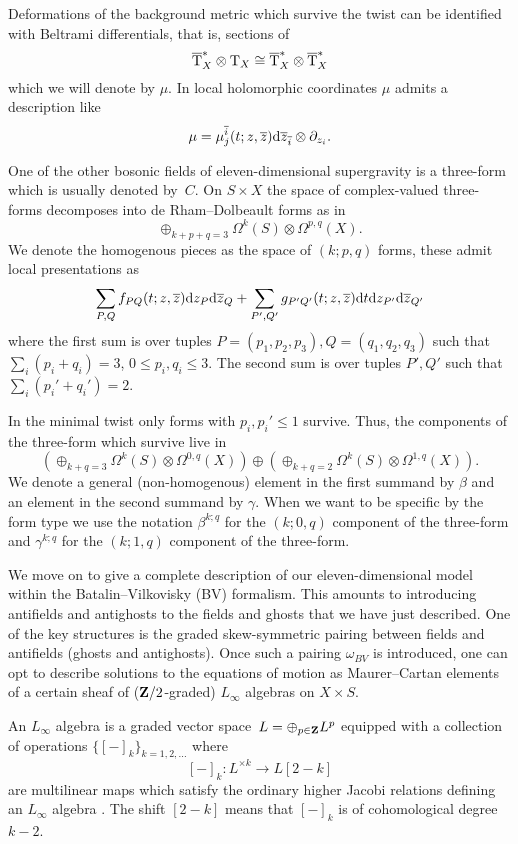 \documentclass[11pt]{amsart}%
\begin{document}
Deformations of the background metric which survive the twist can be identified with Beltrami differentials, that is, sections of 
\[
\overline{{\rm T}}_X^* \otimes {\rm T}_X \cong \overline{{\rm T}}^*_X \otimes \overline{{\rm T}}_X^* 
\]
which we will denote by $\mu$. 
In local holomorphic coordinates $\mu$ admits a description like
\[
\mu = \mu^{\overline{i}}_j (t;z,\overline{z}) {\rm d} \overline{z}_{\overline{i}} \otimes \partial_{z_i} .
\]

One of the other bosonic fields of eleven-dimensional supergravity is a three-form which is usually denoted by~$C$. 
On $S \times X$ the space of complex-valued three-forms decomposes into de Rham--Dolbeault forms as in
\[
\oplus_{k+p+q=3} \Omega^k(S) \otimes \Omega^{p,q}(X) .
\]
We denote the homogenous pieces as the space of $(k;p,q)$ forms, these admit local presentations as
\[
\sum_{P,Q} f_{PQ} (t;z,\overline{z}) {\rm d} z_P {\rm d} \overline{z}_Q + \sum_{P',Q'} g_{P'Q'}(t;z,\overline{z}) {\rm d} t {\rm d} z_{P'}{\rm d} \overline{z}_{Q'} 
\]
where the first sum is over tuples $P=(p_1,p_2,p_3),Q=(q_1,q_2,q_3)$ such that $\sum_i (p_i + q_i) = 3$, $0 \leq p_i,q_i \leq 3$.
The second sum is over tuples $P',Q'$ such that $\sum_i (p_i'+q_i') = 2$. 

In the minimal twist only forms with $p_i ,p_i'\leq 1$ survive. 
Thus, the components of the three-form which survive live in
\[
\left(\oplus_{k+q = 3} \Omega^k(S) \otimes \Omega^{0,q}(X)\right) \oplus 
\left(\oplus_{k+q = 2} \Omega^k(S) \otimes \Omega^{1,q}(X)\right) .
\]
We denote a general (non-homogenous) element in the first summand by $\beta$ and an element in the second summand by $\gamma$.
When we want to be specific by the form type we use the notation $\beta^{k;q}$ for the $(k;0,q)$ component of the three-form and $\gamma^{k;q}$ for the $(k;1,q)$ component of the three-form.

\parsec[s:Lsugra]

We move on to give a complete description of our eleven-dimensional model within the Batalin--Vilkovisky (BV) formalism.
This amounts to introducing antifields and antighosts to the fields and ghosts that we have just described.
One of the key structures is the graded skew-symmetric pairing between fields and antifields (ghosts and antighosts).
Once such a pairing $\omega_{BV}$ is introduced, one can opt to describe solutions to the equations of motion as Maurer--Cartan elements of a certain sheaf of ($\mathbf{Z}/2$-graded) $L_\infty$ algebras on $X \times S$.

An $L_\infty$ algebra is a graded vector space~$L=\oplus_{p\in \mathbf{Z}} L^p$ equipped with a collection of operations $\{[-]_k\}_{k = 1,2,\ldots}$ where 
\[
[-]_k \colon L^{\times k} \to L[2-k] 
\]
are multilinear maps which satisfy the ordinary higher Jacobi relations defining an $L_\infty$ algebra \cite{??}. 
The shift $[2-k]$ means that $[-]_k$ is of cohomological degree $k-2$. 
\end{document}
